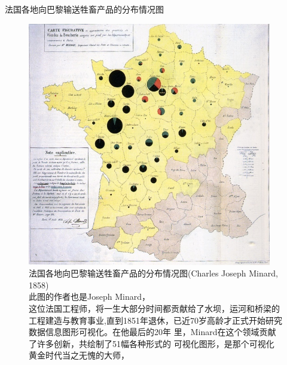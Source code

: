 \documentclass{beamerthemeMono}
\begin{document}
\begin{frame}{\subsecname}{法国各地向巴黎输送牲畜产品的分布情况图}

  \begin{figure}
    \begin{columns}
      \begin{column}{.6\textwidth}
        \includegraphics[width=\columnwidth]{法国各地向巴黎输送牲畜产品的分布情况图.jpg}
      \end{column}

      \begin{column}{.35\textwidth}
        \centering
        \caption{法国各地向巴黎输送牲畜产品的分布情况图(Charles Joseph Minard, 1858)\\
          此图的作者也是Joseph Minard，\\
          这位法国工程师，将一生大部分时间都贡献给了水坝，运河和桥梁的
          工程建造与教育事业,直到1851年退休，已近70岁高龄才正式开始研究数据信息图形可视化。在他最后的20年
          里，Minard在这个领域贡献了许多创新，共绘制了51幅各种形式的
          可视化图形，是那个可视化黄金时代当之无愧的大师，}
      \end{column}
    \end{columns}
  \end{figure}

\end{frame}
\end{document}
